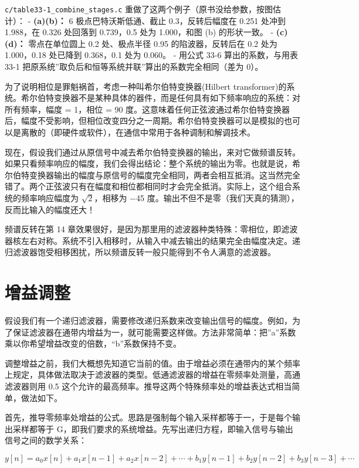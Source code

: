 \texttt{c/table33-1\_combine\_stages.c}
重做了这两个例子（原书没给参数，按图估计）： -
\textbf{(a)(b)：} 6 极点巴特沃斯低通、截止 0.3，反转后幅度在
0.251 处冲到 1.988，在 0.326 处回落到 0.739，0.5 处为 1.000，和图 (b)
的形状一致。 - \textbf{(c)(d)：} 零点在单位圆上 0.2
处、极点半径 0.95 的陷波器，反转后在 0.2 处为 1.000，0.18 处已降到
0.368，0.1 处为 0.060。 - 用公式 33-6 算出的系数，与用表 33-1
把原系统''取负后和恒等系统并联''算出的系数完全相同（差为 0）。

为了说明相位是罪魁祸首，考虑一种叫希尔伯特变换器(Hilbert
transformer)的系统。希尔伯特变换器不是某种具体的器件，而是任何具有如下频率响应的系统：对所有频率，幅度
= 1，相位 = 90
度。这意味着任何正弦波通过希尔伯特变换器后，幅度不受影响，但相位改变四分之一周期。希尔伯特变换器可以是模拟的也可以是离散的（即硬件或软件），在通信中常用于各种调制和解调技术。

现在，假设我们通过从原信号中减去希尔伯特变换器的输出，来对它做频谱反转。如果只看频率响应的幅度，我们会得出结论：整个系统的输出为零。也就是说，希尔伯特变换器输出的幅度与原信号的幅度完全相同，两者会相互抵消。这当然完全错了。两个正弦波只有在幅度和相位都相同时才会完全抵消。实际上，这个组合系统的频率响应幅度为
\(\sqrt{2}\)，相移为 −45
度。输出不但不是零（我们天真的猜测），反而比输入的幅度还大！

频谱反转在第 14
章效果很好，是因为那里用的滤波器种类特殊：零相位，即滤波器核左右对称。系统不引入相移时，从输入中减去输出的结果完全由幅度决定。递归滤波器饱受相移困扰，所以频谱反转一般只能得到不令人满意的滤波器。

\section{增益调整}

假设我们有一个递归滤波器，需要修改递归系数来改变输出信号的幅度。例如，为了保证滤波器在通带内增益为一，就可能需要这样做。方法非常简单：把''a''系数乘以你希望增益改变的倍数，``b''系数保持不变。

调整增益之前，我们大概想先知道它当前的值。由于增益必须在通带内的某个频率上规定，具体做法取决于滤波器的类型。低通滤波器的增益在零频率处测量，高通滤波器则用
0.5
这个允许的最高频率。推导这两个特殊频率处的增益表达式相当简单，做法如下。

首先，推导零频率处增益的公式。思路是强制每个输入采样都等于一，于是每个输出采样都等于
G，即我们要求的系统增益。先写出递归方程，即输入信号与输出信号之间的数学关系：

\[y[n] = a_0 x[n] + a_1 x[n-1] + a_2 x[n-2] + \cdots + b_1 y[n-1] + b_2 y[n-2] + b_3 y[n-3] + \cdots\]

